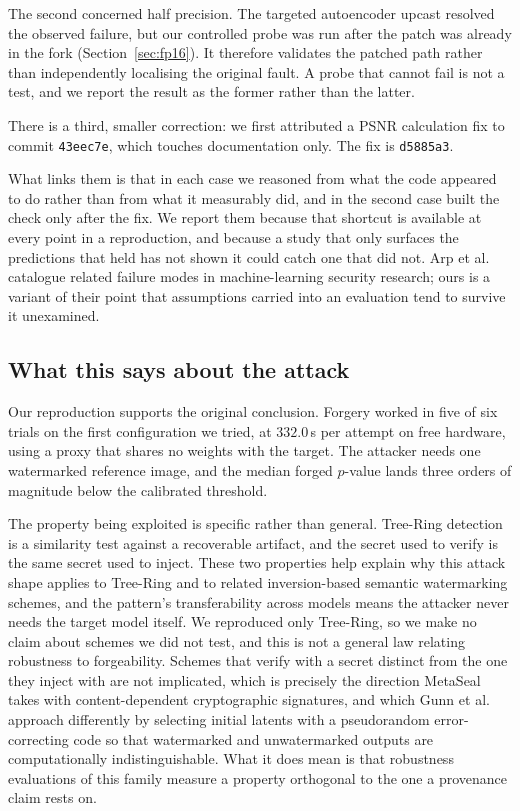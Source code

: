 \documentclass[10pt,twocolumn]{article}
\newcommand{\code}[1]{\texttt{\small #1}}
\begin{document}
The second concerned half precision. The targeted autoencoder upcast resolved the
observed failure, but our controlled probe was run after the patch was already in the
fork (Section~\ref{sec:fp16}). It therefore validates the patched path rather than
independently localising the original fault. A probe that cannot fail is not a test,
and we report the result as the former rather than the latter.

There is a third, smaller correction: we first attributed a PSNR calculation fix to
commit \code{43eec7e}, which touches documentation only. The fix is \code{d5885a3}.

What links them is that in each case we reasoned from what the code appeared to do
rather than from what it measurably did, and in the second case built the check only
after the fix. We report them because that shortcut is available at every point in a
reproduction, and because a study that only surfaces the predictions that held has
not shown it could catch one that did not. Arp et
al.~\cite{arp2022dosdonts} catalogue related failure modes in machine-learning
security research; ours is a variant of their point that assumptions carried into an
evaluation tend to survive it unexamined.

\subsection{What this says about the attack}

Our reproduction supports the original conclusion. Forgery worked in five of six
trials on the first configuration we tried, at $332.0$\,s per attempt on free
hardware, using a proxy that shares no weights with the target. The attacker needs one
watermarked reference image, and the median forged $p$-value lands three orders of
magnitude below the calibrated threshold.

The property being exploited is specific rather than general. Tree-Ring detection is a
similarity test against a recoverable artifact, and the secret used to verify is the
same secret used to inject. These two properties help explain why this attack shape applies to Tree-Ring and to
related inversion-based semantic watermarking schemes, and the pattern's
transferability across models means the attacker never needs the target model itself.
We reproduced only Tree-Ring, so we make no claim about schemes we did not test, and
this is not a general law relating robustness to forgeability.
Schemes that verify with a secret distinct from the one they inject with are not
implicated, which is precisely the direction MetaSeal~\cite{zhou2026metaseal} takes
with content-dependent cryptographic signatures, and which Gunn et
al.~\cite{gunn2025undetectable} approach differently by selecting initial latents
with a pseudorandom error-correcting code so that watermarked and unwatermarked
outputs are computationally indistinguishable.
What it does mean is that robustness evaluations of this family measure a property
orthogonal to the one a provenance claim rests on.
\end{document}
